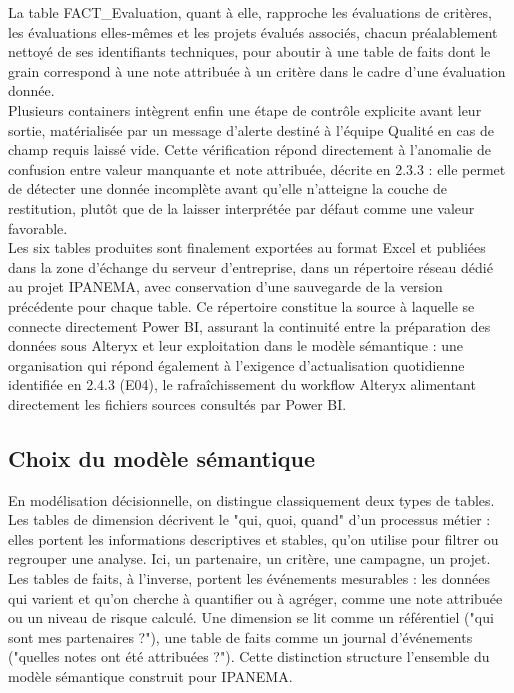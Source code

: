 La table FACT\_Evaluation, quant à elle, rapproche les évaluations de critères, les 
évaluations elles-mêmes et les projets évalués associés, chacun préalablement nettoyé de 
ses identifiants techniques, pour aboutir à une table de faits dont le grain correspond à une 
note attribuée à un critère dans le cadre d'une évaluation donnée. \\

Plusieurs containers intègrent enfin une étape de contrôle explicite avant leur sortie, 
matérialisée par un message d'alerte destiné à l'équipe Qualité en cas de champ requis laissé 
vide. Cette vérification répond directement à l'anomalie de confusion entre valeur manquante 
et note attribuée, décrite en 2.3.3 : elle permet de détecter une donnée incomplète avant qu'elle 
n'atteigne la couche de restitution, plutôt que de la laisser interprétée par défaut comme une 
valeur favorable. \\

Les six tables produites sont finalement exportées au format Excel et publiées dans la 
zone d'échange du serveur d'entreprise, dans un répertoire réseau dédié au projet IPANEMA, 
avec conservation d'une sauvegarde de la version précédente pour chaque table. Ce 
répertoire constitue la source à laquelle se connecte directement Power BI, assurant la 
continuité entre la préparation des données sous Alteryx et leur exploitation dans le modèle 
sémantique : une organisation qui répond également à l'exigence d'actualisation quotidienne 
identifiée en 2.4.3 (E04), le rafraîchissement du workflow Alteryx alimentant directement les 
fichiers sources consultés par Power BI.

\subsection{Choix du modèle sémantique}
En modélisation décisionnelle, on distingue classiquement deux types de tables. Les 
tables de dimension décrivent le "qui, quoi, quand" d'un processus métier : elles portent les 
informations descriptives et stables, qu'on utilise pour filtrer ou regrouper une analyse. Ici, un 
partenaire, un critère, une campagne, un projet. Les tables de faits, à l'inverse, portent les 
événements mesurables : les données qui varient et qu'on cherche à quantifier ou à agréger, 
comme une note attribuée ou un niveau de risque calculé. Une dimension se lit comme un 
référentiel ("qui sont mes partenaires ?"), une table de faits comme un journal d'événements 
("quelles notes ont été attribuées ?"). Cette distinction structure l'ensemble du modèle 
sémantique construit pour IPANEMA. \\

